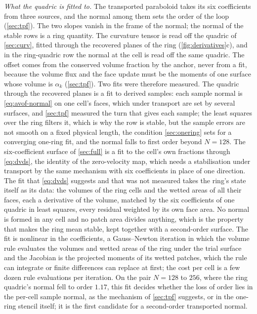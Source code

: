 \documentclass[preprint,12pt]{elsarticle}
\begin{document}
\emph{What the quadric is fitted to.} The transported paraboloid takes its six coefficients from three sources, and the normal among them sets the order of the loop (\cref{sec:tpf}). The two slopes vanish in the frame of the normal; the normal of the stable rows is a ring quantity. The curvature tensor is read off the quadric of \cref{sec:curv}, fitted through the recovered planes of the ring (\cref{fig:derivatives}c), and in the ring-quadric row the normal at the cell is read off the same quadric. The offset comes from the conserved volume fraction by the anchor, never from a fit, because the volume flux and the face update must be the moments of one surface whose volume is $\alpha_k$ (\cref{sec:tpf}). Two fits were therefore measured. The quadric through the recovered planes is a fit to derived samples: each sample normal is \cref{eq:avof-normal} on one cell's faces, which under transport are set by several surfaces, and \cref{sec:tpf} measured the turn that gives each sample; the least squares over the ring filters it, which is why the row is stable, but the sample errors are not smooth on a fixed physical length, the condition \cref{sec:onering} sets for a converging one-ring fit, and the normal falls to first order beyond $N = 128$. The six-coefficient surface of \cref{sec:full} is a fit to the cell's own fractions through \cref{eq:dvds}, the identity of the zero-velocity map, which needs a stabilisation under transport by the same mechanism with six coefficients in place of one direction. The fit that \cref{eq:dvds} suggests and that was not measured takes the ring's state itself as its data: the volumes of the ring cells and the wetted areas of all their faces, each a derivative of the volume, matched by the six coefficients of one quadric in least squares, every residual weighted by its own face area. No normal is formed in any cell and no patch area divides anything, which is the property that makes the ring mean stable, kept together with a second-order surface. The fit is nonlinear in the coefficients, a Gauss--Newton iteration in which the volume rule evaluates the volumes and wetted areas of the ring under the trial surface and the Jacobian is the projected moments of its wetted patches, which the rule can integrate or finite differences can replace at first; the cost per cell is a few dozen rule evaluations per iteration. On the pair $N = 128$ to $256$, where the ring quadric's normal fell to order $1.17$, this fit decides whether the loss of order lies in the per-cell sample normal, as the mechanism of \cref{sec:tpf} suggests, or in the one-ring stencil itself; it is the first candidate for a second-order transported normal.
\end{document}
